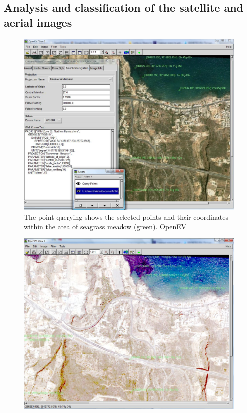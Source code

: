 \documentclass[11pt]{article}
\begin{document}
\begin{appendices}
\subsection{Analysis and classification of the satellite and aerial images}

\begin{figure}[H]
	\begin{center}
		\includegraphics[scale=0.23]{OpenEV-2.jpg}
		\caption{The point querying shows the selected points and their coordinates within the area of seagrass meadow (green). \href{http://openev.sourceforge.net/}{OpenEV}}\label{fig:A.39}	
	\end{center}	
\end{figure}
\begin{figure}[H]
	\begin{center}
		\includegraphics[scale=0.23]{OpenEV-3.jpg}

\end{center}
\end{figure}
\end{appendices}
\end{document}
